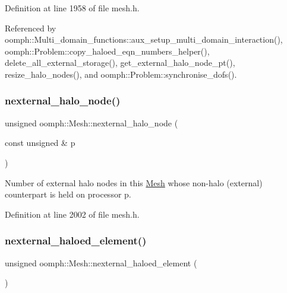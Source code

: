 Definition at line 1958 of file mesh.\+h.



Referenced by oomph\+::\+Multi\+\_\+domain\+\_\+functions\+::aux\+\_\+setup\+\_\+multi\+\_\+domain\+\_\+interaction(), oomph\+::\+Problem\+::copy\+\_\+haloed\+\_\+eqn\+\_\+numbers\+\_\+helper(), delete\+\_\+all\+\_\+external\+\_\+storage(), get\+\_\+external\+\_\+halo\+\_\+node\+\_\+pt(), resize\+\_\+halo\+\_\+nodes(), and oomph\+::\+Problem\+::synchronise\+\_\+dofs().

\mbox{\label{classoomph_1_1Mesh_ad2225d34ba01c6f6b08f60baebab83fb}} 
\subsubsection{\texorpdfstring{nexternal\+\_\+halo\+\_\+node()}{nexternal\_halo\_node()}\hspace{0.1cm}{\footnotesize\ttfamily [2/2]}}
{\footnotesize\ttfamily unsigned oomph\+::\+Mesh\+::nexternal\+\_\+halo\+\_\+node (\begin{DoxyParamCaption}\item[{const unsigned \&}]{p }\end{DoxyParamCaption})\hspace{0.3cm}{\ttfamily [inline]}}



Number of external halo nodes in this \hyperlink{classoomph_1_1Mesh}{Mesh} whose non-\/halo (external) counterpart is held on processor p. 



Definition at line 2002 of file mesh.\+h.

\mbox{\label{classoomph_1_1Mesh_a2ab617e7c2c754234dcad02d3d0ed5ba}} 
\subsubsection{\texorpdfstring{nexternal\+\_\+haloed\+\_\+element()}{nexternal\_haloed\_element()}\hspace{0.1cm}{\footnotesize\ttfamily [1/2]}}
{\footnotesize\ttfamily unsigned oomph\+::\+Mesh\+::nexternal\+\_\+haloed\+\_\+element (\begin{DoxyParamCaption}{ }\end{DoxyParamCaption})\hspace{0.3cm}{\ttfamily [inline]}}



